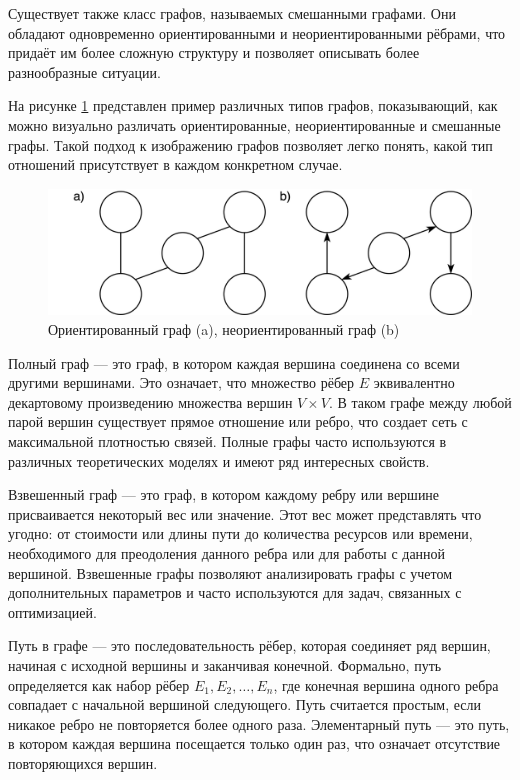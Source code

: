 Существует также класс графов, называемых смешанными графами. Они обладают одновременно ориентированными и неориентированными рёбрами, что придаёт им более сложную структуру и позволяет описывать более разнообразные ситуации.

На рисунке \ref{fig:digraph} представлен пример различных типов графов, показывающий, как можно визуально различать ориентированные, неориентированные и смешанные графы. Такой подход к изображению графов позволяет легко понять, какой тип отношений присутствует в каждом конкретном случае.

\begin{figure}[H]
	\begin{center}
		 \includegraphics[width=0.7\linewidth]{src/img/1/digraph.png}
		 \caption{Ориентированный граф (a), неориентированный граф (b)}
		\label{fig:digraph}
	\end{center}
\end{figure}

Полный граф — это граф, в котором каждая вершина соединена со всеми другими вершинами. Это означает, что множество рёбер $E$ эквивалентно декартовому произведению множества вершин $V \times V$. В таком графе между любой парой вершин существует прямое отношение или ребро, что создает сеть с максимальной плотностью связей. Полные графы часто используются в различных теоретических моделях и имеют ряд интересных свойств.

Взвешенный граф — это граф, в котором каждому ребру или вершине присваивается некоторый вес или значение. Этот вес может представлять что угодно: от стоимости или длины пути до количества ресурсов или времени, необходимого для преодоления данного ребра или для работы с данной вершиной. Взвешенные графы позволяют анализировать графы с учетом дополнительных параметров и часто используются для задач, связанных с оптимизацией.

Путь в графе — это последовательность рёбер, которая соединяет ряд вершин, начиная с исходной вершины и заканчивая конечной. Формально, путь определяется как набор рёбер $E_1, E_2, \ldots, E_n$, где конечная вершина одного ребра совпадает с начальной вершиной следующего. Путь считается простым, если никакое ребро не повторяется более одного раза. Элементарный путь — это путь, в котором каждая вершина посещается только один раз, что означает отсутствие повторяющихся вершин.

